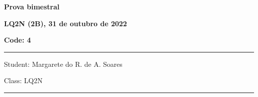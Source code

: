 \documentclass[12pt, addpoints]{exam}
\begin{document}
        \begin{minipage}[b]{0.75\linewidth}
            \begin{flushleft}
                {\bf \large Prova bimestral}
            \end{flushleft}
            \begin{flushleft}
                {\bf \large LQ2N (2B), 31 de outubro de 2022}
            \end{flushleft}
        \end{minipage}
        \begin{minipage}[b]{0.20\linewidth}
            \begin{flushright}
                {\bf \large Code: 4}
            \end{flushright}
        \end{minipage}
        \vspace{0.5cm} \hrule \vspace{0.5cm}
        \begin{minipage}{0.75\linewidth}
            \begin{flushleft}
                Student: Margarete do R. de A. Soares
            \end{flushleft}
        \end{minipage}
        \begin{minipage}{0.20\linewidth}
            \begin{flushright}
                Class: LQ2N
            \end{flushright}
        \end{minipage}
        \vspace{0.5cm} \hrule \vspace{0.5cm}
\end{document}
